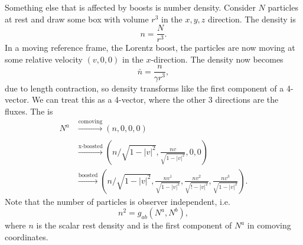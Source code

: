 \documentclass{article}
\numberwithin{equation}{section}
\begin{document}
Something else that is affected by boosts is number density. Consider $N$ particles at rest and draw some box with volume $r^3$ in the $x,y,z$ direction. The density is 
\begin{equation*}
    n = \frac{N}{r^3}.
\end{equation*}
In a moving reference frame, the Lorentz boost, the particles are now moving at some relative velocity $(v,0,0)$ in the $x$-direction. The density now becomes 
\begin{equation*}
    \bar{n} = \frac{n}{\gamma r^3},
\end{equation*}
due to length contraction, so density transforms like the first component of a 4-vector. We can treat this as a 4-vector, where the other 3 directions are the fluxes. The  is
\begin{align*}
    N^a &\xrightarrow[]{\text{comoving}} (n,0,0,0) \\ 
    &\xrightarrow[]{\text{x-boosted}} (n/\sqrt{1-|v|^2},\frac{nv}{\sqrt{1-|v|^2}},0,0) \\ 
    &\xrightarrow[]{\text{boosted}} \left(n/\sqrt{1-|v|^2},\frac{nv^1}{\sqrt{1-|v|^2}},\frac{nv^2}{\sqrt{!-|v|^2}},\frac{nv^3}{\sqrt{1-|v|^2}}\right).
\end{align*}
Note that the number of particles is observer independent, i.e. 
\begin{equation*}
    n^2 = g_{ab}(N^a,N^b),
\end{equation*}
where $n$ is the scalar rest density and is the first component of $N^a$ in comoving coordinates.
\end{document}
